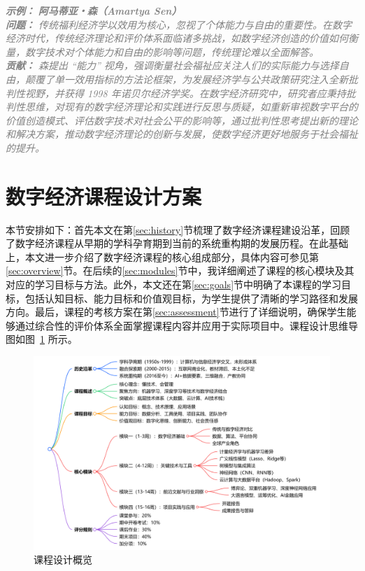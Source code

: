 \documentclass[lang=cn,12pt,a4paper]{elegantpaper}
\newcommand{\skillexample}[1]{\smallskip\noindent\textcolor{gray}{\textit{\footnotesize\textbf{示例：}} \textit{\footnotesize #1}}}
\begin{document}
\skillexample {
\textbf {阿马蒂亚・森（Amartya Sen）}\\
\textbf {问题：} 传统福利经济学以效用为核心，忽视了个体能力与自由的重要性。在数字经济时代，传统经济理论和评价体系面临诸多挑战，如数字经济创造的价值如何衡量，数字技术对个体能力和自由的影响等问题，传统理论难以全面解答。\\
\textbf {贡献：} 森提出 “能力” 视角，强调衡量社会福祉应关注人们的实际能力与选择自由，颠覆了单一效用指标的方法论框架，为发展经济学与公共政策研究注入全新批判性视野，并获得 1998 年诺贝尔经济学奖。在数字经济研究中，研究者应秉持批判性思维，对现有的数字经济理论和实践进行反思与质疑，如重新审视数字平台的价值创造模式、评估数字技术对社会公平的影响等，通过批判性思考提出新的理论和解决方案，推动数字经济理论的创新与发展，使数字经济更好地服务于社会福祉的提升。
}
\section{数字经济课程设计方案}
本节安排如下：首先本文在第\ref{sec:history}节梳理了数字经济课程建设沿革，回顾了数字经济课程从早期的学科孕育期到当前的系统重构期的发展历程。在此基础上，本文进一步介绍了数字经济课程的核心组成部分，具体内容可参见第\ref{sec:overview}节。在后续的\ref{sec:modules}节中，我详细阐述了课程的核心模块及其对应的学习目标与方法。此外，本文还在第\ref{sec:goals}节中明确了本课程的学习目标，包括认知目标、能力目标和价值观目标，为学生提供了清晰的学习路径和发展方向。最后，课程的考核方案在第\ref{sec:assessment}节进行了详细说明，确保学生能够通过综合性的评价体系全面掌握课程内容并应用于实际项目中。课程设计思维导图如图~\ref{fig:intro_course} 所示。
\begin{figure}[H]
    \centering
    \includegraphics[width=1\linewidth]{exported_image.png}
    \caption{课程设计概览}
    \label{fig:intro_course}
\end{figure}
\end{document}
